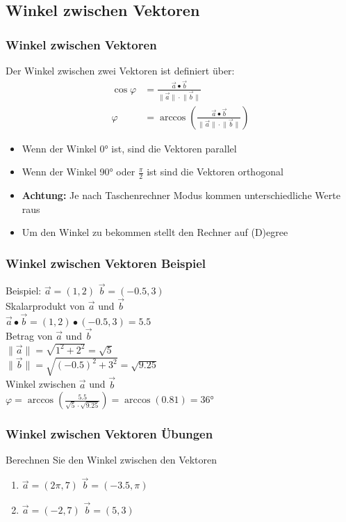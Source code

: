 \subsection{Winkel zwischen Vektoren}
\begin{frame}
    \frametitle{Winkel zwischen Vektoren}
    Der Winkel zwischen zwei Vektoren ist definiert über:
    \begin{align*}
        \cos \varphi &= \frac{\vec{a} \bullet \vec{b}}{\lVert \vec{a} \rVert \cdot \lVert \vec{b} \rVert} \\
        \varphi &= \arccos \left( \frac{\vec{a} \bullet \vec{b}}{\lVert \vec{a} \rVert \cdot \lVert \vec{b} \rVert} \right)
    \end{align*}
    \begin{itemize}
        \item Wenn der Winkel 0° ist, sind die Vektoren parallel
        \item Wenn der Winkel 90° oder $\frac{\pi}{2}$ ist sind die Vektoren orthogonal
        \item \textbf{Achtung:} Je nach Taschenrechner Modus kommen unterschiedliche Werte raus
        \item Um den Winkel zu bekommen stellt den Rechner auf (D)egree
    \end{itemize}
\end{frame}

\begin{frame}
    \frametitle{Winkel zwischen Vektoren Beispiel}
    Beispiel: $\vec{a} = (1,2)$ $\vec{b} = (-0.5, 3)$ \\
    $ $ \\
    Skalarprodukt von $\vec{a}$ und $\vec{b}$ \\
    $\vec{a} \bullet \vec{b} = (1,2) \bullet (-0.5, 3) = 5.5$ \\
    $ $ \\
    Betrag von $\vec{a}$ und $\vec{b}$ \\
    $\lVert \vec{a} \rVert = \sqrt{1^2 + 2^2} = \sqrt{5}$ \\
    $\lVert \vec{b} \rVert = \sqrt{(-0.5)^2 + 3^2} = \sqrt{9.25}$ \\
    $ $ \\
    Winkel zwischen $\vec{a}$ und $\vec{b}$ \\
    $\varphi = \arccos(\frac{5.5}{\sqrt{5} \cdot \sqrt{9.25}}) = \arccos(0.81) = 36$°
\end{frame}

\begin{frame}
    \frametitle{Winkel zwischen Vektoren Übungen}
    Berechnen Sie den Winkel zwischen den Vektoren
    \begin{enumerate}
        \item $\vec{a} = (2\pi, 7)$ $\vec{b} = (-3.5, \pi)$
        \item $\vec{a} = (-2, 7)$ $\vec{b} = (5, 3)$
    \end{enumerate}
\end{frame}

